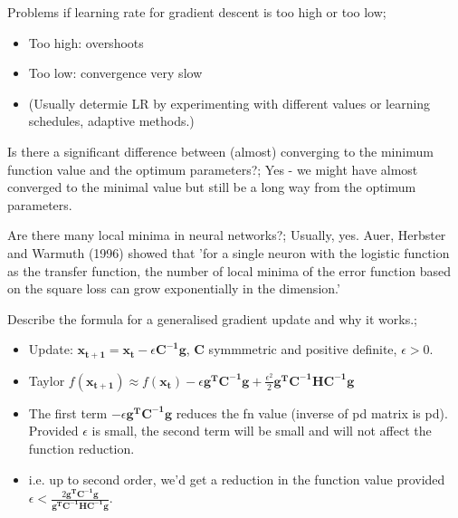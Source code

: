 \documentclass{article}
\begin{document}
Problems if learning rate for gradient descent is too high or too low; \begin{itemize}
	\item Too high: overshoots
	\item Too low: convergence very slow
	\item (Usually determie LR by experimenting with different values or learning schedules, adaptive methods.)
\end{itemize}

Is there a significant difference between (almost) converging to the minimum function value and the optimum parameters?; Yes - we might have almost converged to the minimal value but still be a long way from the optimum parameters.

Are there many local minima in neural networks?; Usually, yes. Auer, Herbster and Warmuth (1996) showed that 'for a single neuron with the logistic function as the transfer function, the number of local minima of the error function based on the square loss can grow exponentially in the dimension.' 

Describe the formula for a generalised gradient update and why it works.; \begin{itemize}
	\item Update: $\mathbf{x_{t+1}}=\mathbf{x_t}-\epsilon \mathbf{C^{-1}g}$, $\mathbf{C}$ symmmetric and positive definite, $\epsilon > 0$.
	\item Taylor $f(\mathbf{x_{t+1}})\approx f(\mathbf{x_t})-\epsilon \mathbf{g^TC^{-1}g}+\frac{\epsilon^2}{2}\mathbf{g^TC^{-1}HC^{-1}g}$
	\item The first term $-\epsilon \mathbf{g^TC^{-1}g}$ reduces the fn value (inverse of pd matrix is pd). Provided $\epsilon$ is small, the second term will be small and will not affect the function reduction. \item i.e. up to second order, we'd get a reduction in the function value provided $\epsilon < \frac{2\mathbf{g^TC^{-1}g}}{\mathbf{g^TC^{-1}HC^{-1}g}}$.
\end{itemize}
\end{document}
